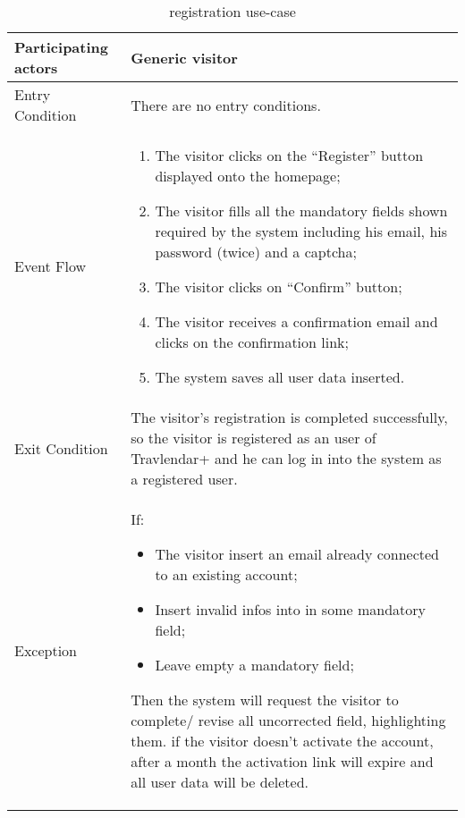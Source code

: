 \begin{table}[H]
	\begin{center}
		\begin{tabular}{ | p{} | p{} | }
		\hline
		Participating actors & Generic visitor\\
		\hline
		Entry Condition & There are no entry conditions.\\
		\hline
		Event Flow & 
			\begin{enumerate}
				\item The visitor clicks on the “Register” button displayed onto the homepage;
				\item The visitor fills all the mandatory fields shown required by the system including his email, his password (twice) and a captcha;
				\item The visitor clicks on “Confirm” button;
				\item The visitor receives a confirmation email and clicks on the confirmation link;
				\item The system saves all user data inserted.
			\end{enumerate} \\
		\hline
		Exit Condition & The visitor’s registration is completed successfully, so the visitor is registered as an user of Travlendar+ and he can log in into the system as a registered user. \\
		\hline
		Exception & If:
				\begin{itemize}
   					\item The visitor insert an email already connected to an existing account;
   					\item Insert invalid infos into in some mandatory field;
   					\item Leave empty a mandatory field;
   				\end{itemize}
   		Then the system will request the visitor to complete/ revise all uncorrected field, highlighting them.
if the visitor doesn’t activate the account, after a month the activation link will expire and all user data will be deleted.\\ 
		\hline
		\end{tabular}
	\end{center}
	\caption{registration use-case}
\end{table}